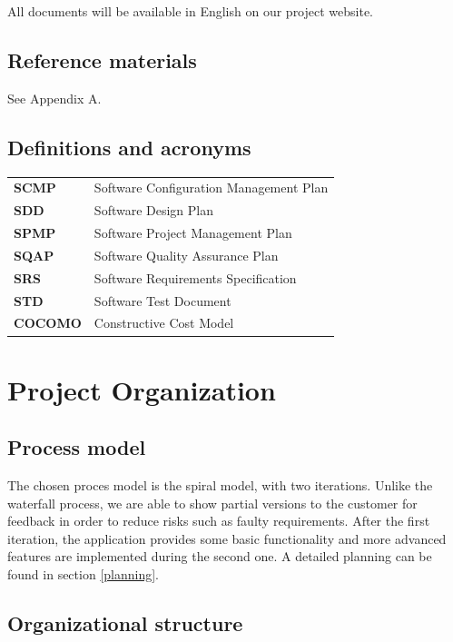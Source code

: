 \documentclass[salesmen, twoside]{../../../templates/latex/2009/softproj}
\begin{document}
\begin{projdoc}
\begin{itemize}
		\end{itemize}	
		All documents will be available in English on our project website.
	
		
		\section{Reference materials}
		
			See Appendix A.
			
		\section{Definitions and acronyms}

			\begin{tabular}{l l}

				\textbf{SCMP} & Software Configuration Management Plan \\
				\textbf{SDD} & Software Design Plan \\
				\textbf{SPMP} & Software Project Management Plan \\
				\textbf{SQAP} & Software Quality Assurance Plan \\
				\textbf{SRS} & Software Requirements Specification \\
				\textbf{STD} & Software Test Document \\
				\textbf{COCOMO} & Constructive Cost Model

			\end{tabular}				

	\chapter{Project Organization}
	
		\section{Process model}
		
		The chosen proces model is the spiral model, with two iterations. Unlike
		the waterfall process, we are able to show partial versions to the customer 
		for feedback in order to reduce risks such as faulty requirements. After the first iteration,
		the application provides some basic functionality and more advanced features are implemented 
		during the second one. A detailed planning can be found in section \ref{planning}.
			
		
		\section{Organizational structure}
		\label{sec:struc}
		

\end{projdoc}
\end{document}
